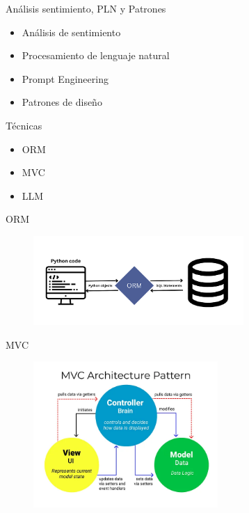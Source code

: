 \documentclass[aspectratio=169,xcolor=dvipsnames, t]{beamer}
\begin{document}
\begin{frame}{Análisis sentimiento, PLN y Patrones}
    \begin{itemize}
        \item Análisis de sentimiento
        \item Procesamiento de lenguaje natural
        \item Prompt Engineering
        \item Patrones de diseño
    \end{itemize}
\end{frame}


\begin{frame}{Técnicas}
    \begin{itemize}
        \item ORM
        \item MVC
        \item LLM
    \end{itemize}
\end{frame}


\begin{frame}{ORM}
\begin{figure}
\includegraphics[width=8cm]{style_data/img/orm.png}
\centering
\end{figure}
\end{frame}


\begin{frame}{MVC}
\begin{figure}[t]
\includegraphics[width=7cm]{style_data/img/mvc_pattern.png}
\centering
\end{figure}
\end{frame}
\end{document}
